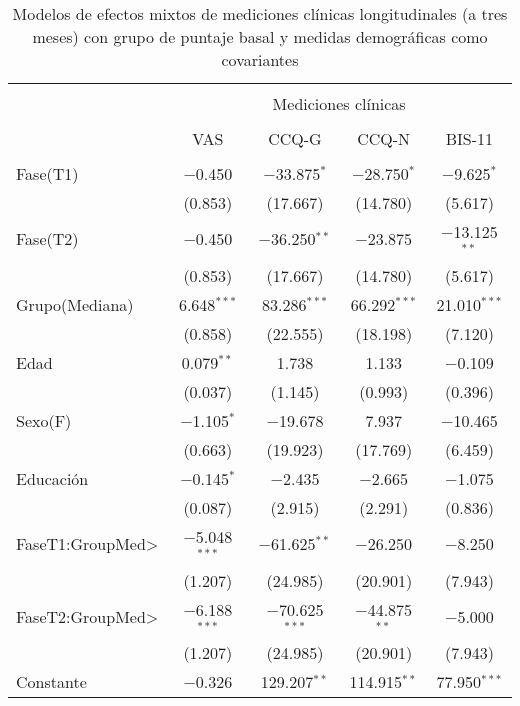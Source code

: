 \begin{table}[!htbp] \centering
  \caption{Modelos de efectos mixtos de mediciones clínicas longitudinales (a tres meses) con grupo de puntaje basal y medidas demográficas como covariantes}
  \label{tab:clin2}
\begin{tabular}{@{\extracolsep{5pt}}lcccc}
\\[-1.8ex]\hline
\hline \\[-1.8ex]
 & \multicolumn{4}{c}{Mediciones clínicas } \\
\cline{2-5}
\\[-1.8ex] & VAS & CCQ-G & CCQ-N & BIS-11\\
\hline \\[-1.8ex]
 Fase(T1) & $-$0.450 & $-$33.875$^{*}$ & $-$28.750$^{*}$ & $-$9.625$^{*}$ \\
  & (0.853) & (17.667) & (14.780) & (5.617) \\
  Fase(T2) & $-$0.450 & $-$36.250$^{**}$ & $-$23.875 & $-$13.125$^{**}$ \\
  & (0.853) & (17.667) & (14.780) & (5.617) \\
  Grupo(Mediana) & 6.648$^{***}$ & 83.286$^{***}$ & 66.292$^{***}$ & 21.010$^{***}$ \\
  & (0.858) &  (22.555) &(18.198) & (7.120) \\
  Edad & 0.079$^{**}$ & 1.738 & 1.133 & $-$0.109 \\
  & (0.037) & (1.145) & (0.993) & (0.396) \\
  Sexo(F) & $-$1.105$^{*}$ & $-$19.678 & 7.937 & $-$10.465 \\
  & (0.663) & (19.923) & (17.769) & (6.459) \\
  Educación & $-$0.145$^{*}$ & $-$2.435 & $-$2.665 & $-$1.075 \\
  & (0.087) & (2.915) & (2.291) & (0.836) \\
  FaseT1:GroupMed\textgreater  & $-$5.048$^{***}$ &  $-$61.625$^{**}$  & $-$26.250  & $-$8.250 \\
  & (1.207) & (24.985) & (20.901) & (7.943) \\
  FaseT2:GroupMed\textgreater  & $-$6.188$^{***}$ & $-$70.625$^{***}$  & $-$44.875$^{**}$  & $-$5.000 \\
  & (1.207) & (24.985) & (20.901) & (7.943) \\
  Constante & $-$0.326 & 129.207$^{**}$ & 114.915$^{**}$ & 77.950$^{***}$ \\

\end{tabular}
\end{table}
